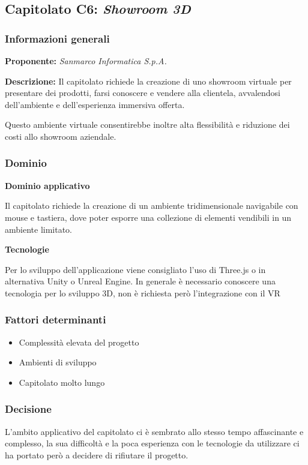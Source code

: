 \subsection{Capitolato C6: \textit{Showroom 3D}}

\subsubsection{Informazioni generali}

\textbf{Proponente:} \textit{Sanmarco Informatica S.p.A.}

\textbf{Descrizione:} Il capitolato richiede la creazione di uno showroom virtuale per presentare dei prodotti, farsi conoscere e vendere alla clientela, avvalendosi dell’ambiente e dell’esperienza immersiva offerta.

Questo ambiente virtuale consentirebbe inoltre alta flessibilità e riduzione dei costi allo showroom aziendale.

\subsubsection{Dominio}

\textbf{Dominio applicativo}

Il capitolato richiede la creazione di un ambiente tridimensionale navigabile con mouse e tastiera, dove poter esporre una collezione di elementi vendibili in un ambiente limitato.

\textbf{Tecnologie}

Per lo sviluppo dell'applicazione viene consigliato l'uso di Three.js o in alternativa Unity o Unreal Engine. In generale è necessario conoscere una tecnologia per lo sviluppo 3D, non è richiesta però l'integrazione con il VR

\subsubsection{Fattori determinanti}
\begin{itemize}
    \item Complessità elevata del progetto
    \item Ambienti di sviluppo
    \item Capitolato molto lungo
\end{itemize}

\subsubsection{Decisione}

L'ambito applicativo del capitolato ci è sembrato allo stesso tempo affascinante e complesso, la sua difficoltà e la poca esperienza con le tecnologie da utilizzare ci ha portato però a decidere di rifiutare il progetto.
